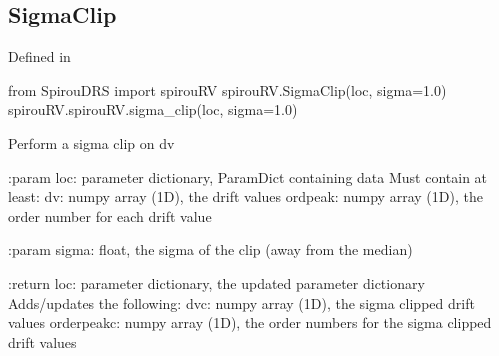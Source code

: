 \begin{minipage}{\textwidth}
\subsection{SigmaClip}

Defined in \spirouRV{}

\begin{pythonbox}
from SpirouDRS import spirouRV
spirouRV.SigmaClip(loc, sigma=1.0)
spirouRV.spirouRV.sigma_clip(loc, sigma=1.0)
\end{pythonbox}

\begin{pythondocstring}
Perform a sigma clip on dv

:param loc: parameter dictionary, ParamDict containing data
        Must contain at least:
            dv: numpy array (1D), the drift values
            ordpeak: numpy array (1D), the order number for each drift
                     value

:param sigma: float, the sigma of the clip (away from the median)

:return loc: parameter dictionary, the updated parameter dictionary
        Adds/updates the following:
            dvc: numpy array (1D), the sigma clipped drift values
            orderpeakc: numpy array (1D), the order numbers for the sigma
                        clipped drift values
\end{pythondocstring}
\end{minipage}

